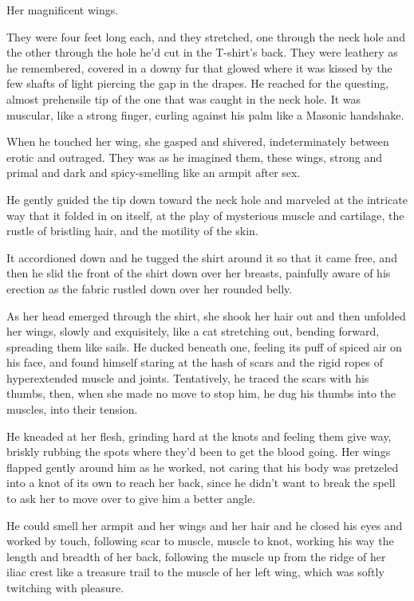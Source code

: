 Her magnificent wings.

They were four feet long each, and they stretched, one through the
neck hole and the other through the hole he'd cut in the T-shirt's
back.  They were leathery as he remembered, covered in a downy fur
that glowed where it was kissed by the few shafts of light piercing
the gap in the drapes.  He reached for the questing, almost prehensile
tip of the one that was caught in the neck hole.  It was muscular,
like a strong finger, curling against his palm like a Masonic
handshake.

When he touched her wing, she gasped and shivered, indeterminately
between erotic and outraged.  They was as he imagined them, these
wings, strong and primal and dark and spicy-smelling like an armpit
after sex.

He gently guided the tip down toward the neck hole and marveled at the
intricate way that it folded in on itself, at the play of mysterious
muscle and cartilage, the rustle of bristling hair, and the motility
of the skin.

It accordioned down and he tugged the shirt around it so that it came
free, and then he slid the front of the shirt down over her breasts,
painfully aware of his erection as the fabric rustled down over her
rounded belly.

As her head emerged through the shirt, she shook her hair out and then
unfolded her wings, slowly and exquisitely, like a cat stretching out,
bending forward, spreading them like sails.  He ducked beneath one,
feeling its puff of spiced air on his face, and found himself staring
at the hash of scars and the rigid ropes of hyperextended muscle and
joints.  Tentatively, he traced the scars with his thumbs, then, when
she made no move to stop him, he dug his thumbs into the muscles, into
their tension.

He kneaded at her flesh, grinding hard at the knots and feeling them
give way, briskly rubbing the spots where they'd been to get the blood
going.  Her wings flapped gently around him as he worked, not caring
that his body was pretzeled into a knot of its own to reach her back,
since he didn't want to break the spell to ask her to move over to
give him a better angle.

He could smell her armpit and her wings and her hair and he closed his
eyes and worked by touch, following scar to muscle, muscle to knot,
working his way the length and breadth of her back, following the
muscle up from the ridge of her iliac crest like a treasure trail to
the muscle of her left wing, which was softly twitching with pleasure.

